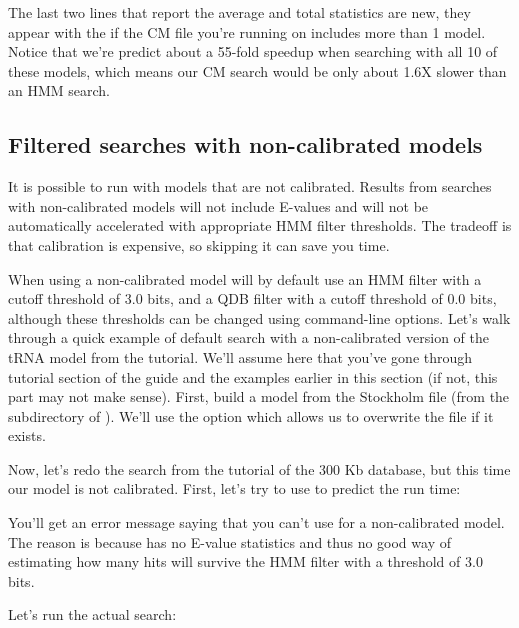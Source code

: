 The last two lines that report the average and total statistics are
new, they appear with the  if the
CM file you're running   on includes more than 1 model. 
Notice that we're predict about a 55-fold speedup when searching with
all 10 of these models, which means our CM search would be only about
1.6X slower than an HMM search.

\subsection{Filtered searches with non-calibrated models}

It is possible to run  with models that are not
calibrated. Results from searches with non-calibrated models will not
include E-values and will not be automatically accelerated with
appropriate HMM filter thresholds. The tradeoff is that calibration is
expensive, so skipping it can save you time.  

When using a non-calibrated model  will by default use
an HMM filter with a cutoff threshold of $3.0$ bits, and a QDB filter
with a cutoff threshold of $0.0$ bits, although these thresholds can
be changed using command-line options. Let's walk through a quick
example of default search with a non-calibrated version of the tRNA model
from the tutorial. We'll assume here that you've gone through tutorial
section of the guide and the examples earlier in this section (if not,
this part may not make sense).  First, build a model from the
 Stockholm file (from the 
subdirectory of ). We'll use the  option
which allows us to overwrite the file  if it exists.


Now, let's redo the search from the tutorial of the 300 Kb database,
but this time our model is not calibrated. First, let's try to use
 to predict the run time: 


You'll get an error message saying that you can't use
 for a non-calibrated model. The reason is because
 has no E-value statistics and thus no good way of
estimating how many hits will survive the HMM filter with a threshold
of $3.0$ bits. 

Let's run the actual search:

